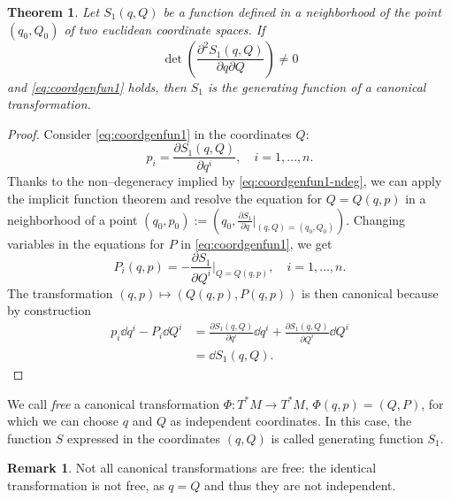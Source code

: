 \documentclass[english,fontsize=11pt,paper=b5]{scrbook}
\numberwithin{equation}{chapter}
\newtheorem{theorem}{Theorem}[chapter]
\theoremstyle{definition}
\newtheorem{remark}{Remark}[chapter]
\begin{document}
    \begin{theorem}\label{thm:S1}
      Let $S_1(q,Q)$ be a function defined in a neighborhood of the point $(q_0, Q_0)$ of two euclidean coordinate spaces. If
      \begin{equation}\label{eq:coordgenfun1-ndeg}
        \det\left( \frac{\partial^2 S_1(q,Q)}{\partial q \partial Q} \right)\neq 0
      \end{equation}
      and \eqref{eq:coordgenfun1} holds, then $S_1$ is the generating function of a canonical transformation.
    \end{theorem}
    \begin{proof}
      Consider \eqref{eq:coordgenfun1} in the coordinates $Q$:
      \begin{equation}
        p_i = \frac{\partial S_1(q,Q)}{\partial q^i}, \quad i = 1,\ldots, n.
      \end{equation}
      Thanks to the non--degeneracy implied by \eqref{eq:coordgenfun1-ndeg}, we can apply the implicit function theorem and resolve the equation for $Q = Q(q,p)$ in a neighborhood of a point $(q_0, p_0) := \left(q_0, \frac{\partial S_1}{\partial q}\Big|_{(q,Q) =(q_0, Q_0)}\right)$.
      Changing variables in the equations for $P$ in \eqref{eq:coordgenfun1}, we get
      \begin{equation}
        P_i(q,p) = -\frac{\partial S_1}{\partial Q^i}\Big|_{Q=Q(q,p)},\quad i=1,\ldots,n.
      \end{equation}
      The transformation $(q,p) \mapsto (Q(q,p), P(q,p))$ is then canonical because by construction
      \begin{align}
        p_i \dd q^i - P_i \dd Q^i & = \frac{\partial S_1(q,Q)}{\partial q^i}\dd q^i + \frac{\partial S_1(q,Q)}{\partial Q^i}\dd Q^i \\
                                  & = \dd S_1(q,Q).
      \end{align}
    \end{proof}

    \begin{tcolorbox}
      We call \emph{free} a canonical transformation $\Phi:T^*M\to T^* M$, $\Phi(q,p) = (Q,P)$, for which we can choose $q$ and $Q$ as independent coordinates.
      In this case, the function $S$ expressed in the coordinates $(q,Q)$ is called generating function $S_1$.
    \end{tcolorbox}

    \begin{remark}
      Not all canonical transformations are free: the identical transformation is not free, as $q=Q$ and thus they are not independent.
    \end{remark}
\end{document}
